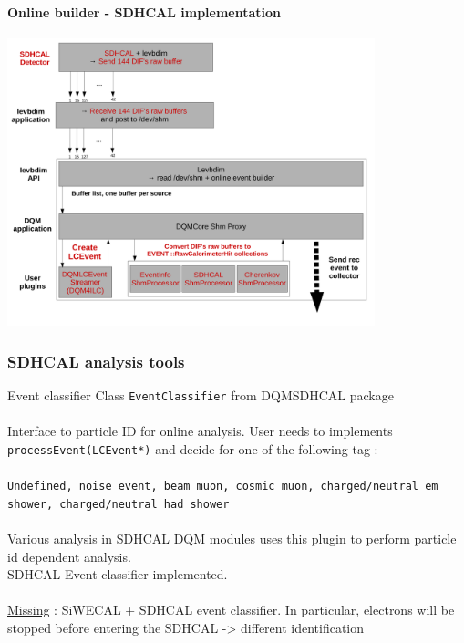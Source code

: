 \documentclass[8pt]{beamer}
\begin{document}
  
  
  \begin{frame}[containsverbatim]
    \frametitle{\secname}
    \framesubtitle{Online builder - SDHCAL implementation}
    \begin{center}
      \includegraphics[width=0.8\textwidth]{figs/DQMeventbuilder_sdhcal.pdf}
    \end{center}
  \end{frame}
  
  
  \begin{frame}[containsverbatim]
    \frametitle{\secname}
    \frametitle{SDHCAL analysis tools}
    \begin{block}{Event classifier}
      Class \verb|EventClassifier| from DQMSDHCAL package\\ ~\\
      Interface to particle ID for online analysis. User needs to implements \verb|processEvent(LCEvent*)| and decide for one of the following tag : \\ 
      ~ \\
      {\tt Undefined, noise event, beam muon, cosmic muon, charged/neutral em shower, charged/neutral had shower} \\
      ~ \\
      
      Various analysis in SDHCAL DQM modules uses this plugin to perform particle id dependent analysis. \\
      SDHCAL Event classifier implemented. \\~\\
      \underline{Missing} : SiWECAL + SDHCAL event classifier. In particular, electrons will be stopped before entering the SDHCAL -> different identification
    \end{block}
  \end{frame}
    
\end{document}
